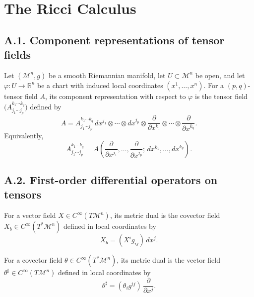 \chapter{The Ricci Calculus}

\section*{A.1. Component representations of tensor fields}

\begin{definition}
\label{appa-def-component-representation}

Let \((\mathcal M^n,g)\) be a smooth Riemannian manifold, let \(U\subset \mathcal M^n\) be open, and let \(\varphi:U\to \mathbb R^n\) be a chart with induced local coordinates \((x^1,\ldots,x^n)\). For a \((p,q)\)-tensor field \(A\), its component representation with respect to \(\varphi\) is the tensor field \(\bigl(A^{k_1\cdots k_q}_{j_1\cdots j_p}\bigr)\) defined by
\[
A = A^{k_1\cdots k_q}_{j_1\cdots j_p}\, dx^{j_1}\otimes \cdots \otimes dx^{j_p}\otimes \frac{\partial}{\partial x^{k_1}}\otimes \cdots \otimes \frac{\partial}{\partial x^{k_q}}.
\]
Equivalently,
\[
A^{k_1\cdots k_q}_{j_1\cdots j_p}
=
A\!\left(
\frac{\partial}{\partial x^{j_1}},\ldots,\frac{\partial}{\partial x^{j_p}};\,
dx^{k_1},\ldots,dx^{k_q}
\right).
\]
\end{definition}

\section*{A.2. First-order differential operators on tensors}

\begin{definition}
\label{appa-def-metric-dual-vector}

For a vector field \(X\in C^\infty(T\mathcal M^n)\), its metric dual is the covector field \(X_b\in C^\infty(T^*\mathcal M^n)\) defined in local coordinates by
\[
X_b=(X^i g_{ij})\,dx^j.
\]
\end{definition}

\begin{definition}
\label{appa-def-metric-dual-covector}

For a covector field \(\theta\in C^\infty(T^*\mathcal M^n)\), its metric dual is the vector field \(\theta^\sharp\in C^\infty(T\mathcal M^n)\) defined in local coordinates by
\[
\theta^\sharp = (\theta_i g^{ij})\,\frac{\partial}{\partial x^j}.
\]
\end{definition}

